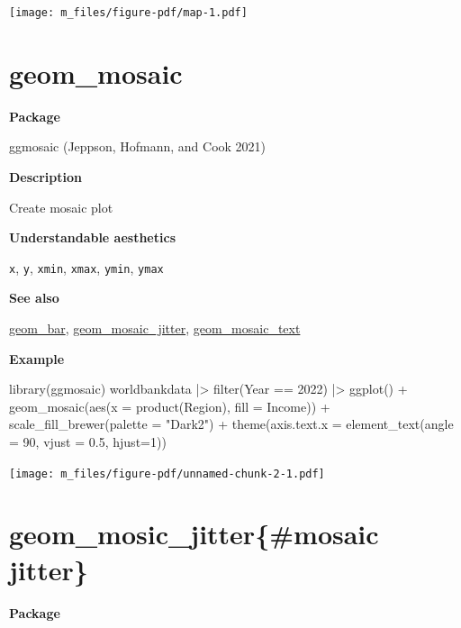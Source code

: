 \documentclass[
  letterpaper,
  DIV=11,
  numbers=noendperiod]{scrreprt}
\newenvironment{Shaded}{\begin{snugshade}}{\end{snugshade}}
\newcommand{\AttributeTok}[1]{\textcolor[rgb]{0.40,0.45,0.13}{#1}}
\newcommand{\DecValTok}[1]{\textcolor[rgb]{0.68,0.00,0.00}{#1}}
\newcommand{\FloatTok}[1]{\textcolor[rgb]{0.68,0.00,0.00}{#1}}
\newcommand{\FunctionTok}[1]{\textcolor[rgb]{0.28,0.35,0.67}{#1}}
\newcommand{\NormalTok}[1]{\textcolor[rgb]{0.00,0.23,0.31}{#1}}
\newcommand{\SpecialCharTok}[1]{\textcolor[rgb]{0.37,0.37,0.37}{#1}}
\newcommand{\StringTok}[1]{\textcolor[rgb]{0.13,0.47,0.30}{#1}}
\begin{document}
\texttt{[image: m\_files/figure-pdf/map-1.pdf]}

\section{geom\_mosaic}\label{mosaic}

\textbf{Package}

ggmosaic (Jeppson, Hofmann, and Cook 2021)

\textbf{Description}

Create mosaic plot

\textbf{Understandable aesthetics}

\texttt{x}, \texttt{y}, \texttt{xmin}, \texttt{xmax}, \texttt{ymin},
\texttt{ymax}

\textbf{See also}

\hyperref[bar]{geom\_bar},
\hyperref[mosaic_jitter]{geom\_mosaic\_jitter},
\hyperref[mosaic_text]{geom\_mosaic\_text}

\textbf{Example}

\begin{Shaded}
\begin{Highlighting}[]
\FunctionTok{library}\NormalTok{(ggmosaic)}
\NormalTok{worldbankdata }\SpecialCharTok{|\textgreater{}}
  \FunctionTok{filter}\NormalTok{(Year }\SpecialCharTok{==} \DecValTok{2022}\NormalTok{) }\SpecialCharTok{|\textgreater{}}
  \FunctionTok{ggplot}\NormalTok{() }\SpecialCharTok{+}
  \FunctionTok{geom\_mosaic}\NormalTok{(}\FunctionTok{aes}\NormalTok{(}\AttributeTok{x =} \FunctionTok{product}\NormalTok{(Region), }\AttributeTok{fill =}\NormalTok{ Income)) }\SpecialCharTok{+} 
  \FunctionTok{scale\_fill\_brewer}\NormalTok{(}\AttributeTok{palette =} \StringTok{"Dark2"}\NormalTok{) }\SpecialCharTok{+} 
  \FunctionTok{theme}\NormalTok{(}\AttributeTok{axis.text.x =} \FunctionTok{element\_text}\NormalTok{(}\AttributeTok{angle =} \DecValTok{90}\NormalTok{, }\AttributeTok{vjust =} \FloatTok{0.5}\NormalTok{, }\AttributeTok{hjust=}\DecValTok{1}\NormalTok{)) }
\end{Highlighting}
\end{Shaded}

\texttt{[image: m\_files/figure-pdf/unnamed-chunk-2-1.pdf]}

\section{geom\_mosic\_jitter\{\#mosaic
jitter\}}\label{geom_mosic_jittermosaic-jitter}

\textbf{Package}
\end{document}
